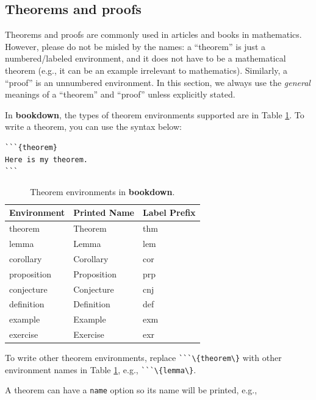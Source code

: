 \documentclass[doctor,openright,twoside]{sjtuthesis}
\newcommand{\passthrough}[1]{#1}
\theoremstyle{plain}
\theoremstyle{definition}
\theoremstyle{remark}
\theoremstyle{ocrenumbox}
\theoremstyle{plain}
\begin{document}
\hypertarget{theorems}{%
\subsection{Theorems and proofs}\label{theorems}}

Theorems and proofs are commonly used in articles and
books in mathematics. However, please do not be misled by the names: a
``theorem'' is just a numbered/labeled environment, and it does not have
to be a mathematical theorem (e.g., it can be an example irrelevant to
mathematics). Similarly, a ``proof'' is an unnumbered environment. In
this section, we always use the \emph{general} meanings of a ``theorem''
and ``proof'' unless explicitly stated.

In \textbf{bookdown}, the types of theorem environments supported are in
Table \ref{tab:theorem-envs}. To write a theorem, you can use the syntax
below:

\begin{lstlisting}
```{theorem}
Here is my theorem.
```
\end{lstlisting}



\begin{table}

\caption{\label{tab:theorem-envs}Theorem environments in \textbf{bookdown}.}
\centering
\begin{tabular}[t]{lll}
\toprule
Environment & Printed Name & Label Prefix\\
\midrule
theorem & Theorem & thm\\
lemma & Lemma & lem\\
corollary & Corollary & cor\\
proposition & Proposition & prp\\
conjecture & Conjecture & cnj\\
\addlinespace
definition & Definition & def\\
example & Example & exm\\
exercise & Exercise & exr\\
\bottomrule
\end{tabular}
\end{table}

To write other theorem environments, replace
\passthrough{\lstinline!```\{theorem\}!} with other environment names in
Table \ref{tab:theorem-envs}, e.g.,
\passthrough{\lstinline!```\{lemma\}!}.

A theorem can have a \passthrough{\lstinline!name!} option so its name
will be printed, e.g.,
\end{document}

